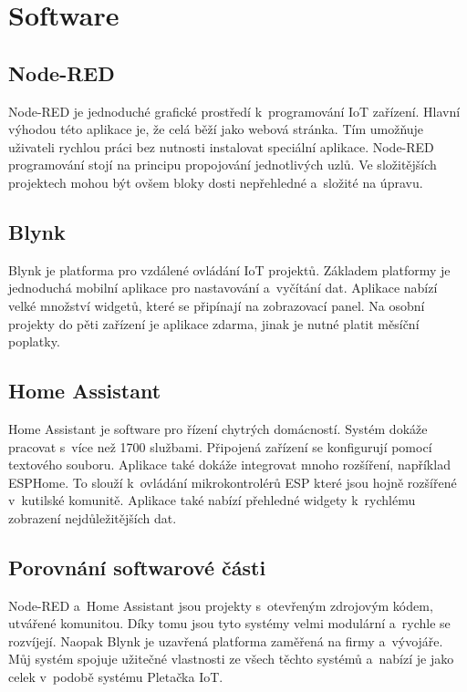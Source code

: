 \newpage

\section{Software}


\subsection{Node-RED}
Node-RED je jednoduché grafické prostředí k~programování IoT zařízení. 
Hlavní výhodou této aplikace je, že celá běží jako webová stránka. 
Tím umožňuje uživateli rychlou práci bez nutnosti instalovat speciální aplikace.
Node-RED programování stojí na principu propojování jednotlivých uzlů.
Ve složitějších projektech mohou být ovšem bloky dosti nepřehledné a~složité na úpravu.


\subsection{Blynk}
Blynk je platforma pro vzdálené ovládání IoT projektů.
Základem platformy je jednoduchá mobilní aplikace pro nastavování a~vyčítání dat.
Aplikace nabízí velké množství widgetů, které se připínají na zobrazovací panel.
Na osobní projekty do pěti zařízení je aplikace zdarma, jinak je nutné platit měsíční poplatky.


\subsection{Home Assistant}
Home Assistant je software pro řízení chytrých domácností. 
Systém dokáže pracovat s~více než 1700 službami.
Připojená zařízení se konfigurují pomocí textového souboru.
Aplikace také dokáže integrovat mnoho rozšíření, například ESPHome.
To slouží k~ovládání mikrokontrolérů ESP které jsou hojně rozšířené v~kutilské komunitě.
Aplikace také nabízí přehledné widgety k~rychlému zobrazení nejdůležitějších dat. 


\subsection{Porovnání softwarové části}
Node-RED a~Home Assistant jsou projekty s~otevřeným zdrojovým kódem, utvářené komunitou.
Díky tomu jsou tyto systémy velmi modulární a~rychle se rozvíjejí. %
Naopak Blynk je uzavřená platforma zaměřená na firmy a~vývojáře.
Můj systém spojuje užitečné vlastnosti ze všech těchto systémů a~nabízí je jako celek v~podobě systému Pletačka IoT.
